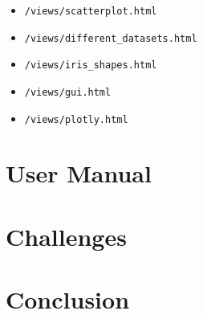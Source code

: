 \documentclass{scrartcl}
\begin{document}
\begin{itemize}
\item \verb|/views/scatterplot.html|
\item \verb|/views/different_datasets.html|
\item \verb|/views/iris_shapes.html|
\item \verb|/views/gui.html|
\item \verb|/views/plotly.html|
\end{itemize}

\section{User Manual}

\section{Challenges}

\section{Conclusion}
\end{document}
